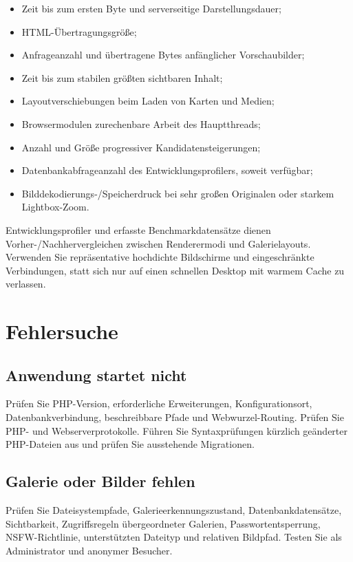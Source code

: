 \documentclass[11pt,a4paper]{article}
\begin{document}
\begin{itemize}
  \item Zeit bis zum ersten Byte und serverseitige Darstellungsdauer;
  \item HTML-Übertragungsgröße;
  \item Anfrageanzahl und übertragene Bytes anfänglicher Vorschaubilder;
  \item Zeit bis zum stabilen größten sichtbaren Inhalt;
  \item Layoutverschiebungen beim Laden von Karten und Medien;
  \item Browsermodulen zurechenbare Arbeit des Hauptthreads;
  \item Anzahl und Größe progressiver Kandidatensteigerungen;
  \item Datenbankabfrageanzahl des Entwicklungsprofilers, soweit verfügbar;
  \item Bilddekodierungs-/Speicherdruck bei sehr großen Originalen oder starkem
  Lightbox-Zoom.
\end{itemize}

Entwicklungsprofiler und erfasste Benchmarkdatensätze dienen
Vorher-/Nachhervergleichen zwischen Renderermodi und Galerielayouts. Verwenden
Sie repräsentative hochdichte Bildschirme und eingeschränkte Verbindungen, statt
sich nur auf einen schnellen Desktop mit warmem Cache zu verlassen.
\section{Fehlersuche}
\label{sec:troubleshooting}

\subsection{Anwendung startet nicht}

Prüfen Sie PHP-Version, erforderliche Erweiterungen, Konfigurationsort,
Datenbankverbindung, beschreibbare Pfade und Webwurzel-Routing. Prüfen Sie PHP-
und Webserverprotokolle. Führen Sie Syntaxprüfungen kürzlich geänderter
PHP-Dateien aus und prüfen Sie ausstehende Migrationen.

\subsection{Galerie oder Bilder fehlen}

Prüfen Sie Dateisystempfade, Galerieerkennungszustand, Datenbankdatensätze,
Sichtbarkeit, Zugriffsregeln übergeordneter Galerien, Passwortentsperrung,
NSFW-Richtlinie, unterstützten Dateityp und relativen Bildpfad. Testen Sie als
Administrator und anonymer Besucher.
\end{document}
